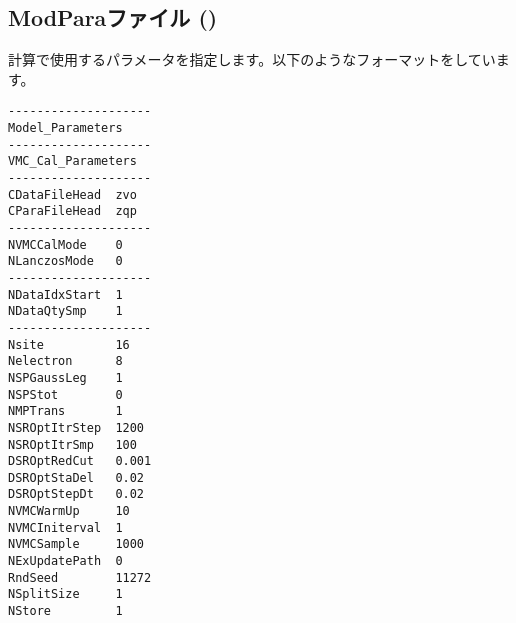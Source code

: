 \newpage
\subsection{ModParaファイル ()}
\label{Subsec:modpara}
計算で使用するパラメータを指定します。以下のようなフォーマットをしています。\\
\begin{minipage}{10cm}
\begin{screen}
\begin{verbatim}
--------------------
Model_Parameters 
--------------------
VMC_Cal_Parameters
--------------------
CDataFileHead  zvo
CParaFileHead  zqp
--------------------
NVMCCalMode    0
NLanczosMode   0
--------------------
NDataIdxStart  1
NDataQtySmp    1
--------------------
Nsite          16
Nelectron      8
NSPGaussLeg    1
NSPStot        0
NMPTrans       1
NSROptItrStep  1200
NSROptItrSmp   100
DSROptRedCut   0.001
DSROptStaDel   0.02
DSROptStepDt   0.02
NVMCWarmUp     10
NVMCIniterval  1
NVMCSample     1000
NExUpdatePath  0
RndSeed        11272
NSplitSize     1
NStore         1  
\end{verbatim}
\end{screen}
\end{minipage}

